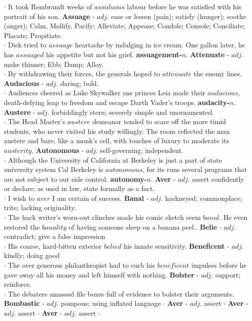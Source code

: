 \documentclass{exam}
\begin{document}
\begin{questions}
$\cdot$ It took Rembrandt weeks of $assiduous$ labour before he was satisfied with his portrait of his son. 
 \question \textbf{Assuage} - $adj.$ ease or lessen (pain); satisfy (hunger); soothe (anger); Calm, Mollify, Pacify; Alleviate; Appease; Condole; Console; Conciliate; Placate; Propitiate.\\
$\cdot$ Dick tried to $assuage$ heartache by indulging in ice cream. One gallon later, he has $assuaged$ his appetite but not his grief. \textbf{assuagement-$n.$}
 \question \textbf{Attenuate} - $adj.$  make thinner; Ebb; Damp; Alloy.\\
$\cdot$ By withdrawing their forces, the generals hoped to $attenuate$ the enemy lines.
 \question \textbf{Audacious} - $adj.$  daring; bold.\\
$\cdot$ Audiences cheered as Luke Skywalker ans princes Leia made their $audacious$, death-defying leap to freedom and escape Darth Vader's troops. \textbf{audacity-$n.$}
 \question \textbf{Austere} - $adj.$ forbiddingly stern; severely simple and unornamented.\\
$\cdot$ The Head Master's $austere$ demeanor tended to scare off the more timid students, who never visited his study willingly. The room reflected the man austere and bare, like a monk's cell, with touches of luxury to moderate its $austerity$.
 \question \textbf{Autonomous} - $adj.$  self-governing; independent.\\
$\cdot$ Although the University of California at Berkeley is just a part of state university system Cal Berkeley is $autonomous$, for its runs several programs that are not subject to out side control. \textbf{autonomy-$n.$}
 \question \textbf{Aver} - $adj.$  assert confidently or declare; as used in law, state formally as a fact.\\
$\cdot$ I wish to $aver$ I am certain of success.
 \question \textbf{Banal} - $adj.$ hackneyed; commonplace; trite; lacking originality.\\ 
 $\cdot$ The hack writer's worn-out clinches made his comic sketch seem $banal$. He even restored the $banality$ of having someone sleep on a banana peel.. 
  \question \textbf{Belie} - $adj.$  contradict; give a false impression\\
 $\cdot$ His coarse, hard-bitten exterior $belied$ his innate sensitivity.
  \question \textbf{Beneficent} - $adj.$ kindly; doing good\\
 $\cdot$ The over generous philanthropist had to curb his $beneficent$ impulses before he gave away all his money and left himself with nothing. 
  \question \textbf{Bolster} - $adj.$  support; reinforce.\\
 $\cdot$ The debaters amassed file boxes full of evidence to bolster their arguments.
  \question \textbf{Bombastic} - $adj.$  pompous; using inflated language
 $\cdot$
  \question \textbf{Aver} - $adj.$  assert 
 $\cdot$
  \question \textbf{Aver} - $adj.$  assert 
 $\cdot$
  \question \textbf{Aver} - $adj.$  assert 
 $\cdot$
\end{questions}
\end{document}
